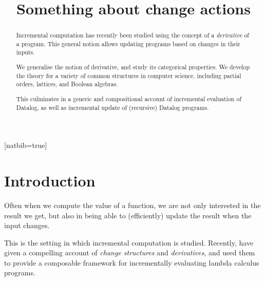 
%


\usepackage{amsmath}
\usepackage{amsthm}
\usepackage{amssymb}
\usepackage{mathtools}
\usepackage{stmaryrd}
\usepackage{biblatex}[natbib=true]
\usepackage{hyperref}
\usepackage{cleveref}



\newif\ifproofs
\proofstrue





%


\begin{abstract}
  Incremental computation has recently been studied using the concept of a
  \textit{derivative} of a program. This general notion allows updating programs
  based on changes in their inputs.

  We generalise the notion of derivative, and study its categorical
  properties. We develop the theory for a variety of common structures
  in computer science, including partial orders, lattices, and Boolean algebras.

  This culminates in a generic and compositional account of incremental evaluation of Datalog, as
  well as incremental update of (recursive) Datalog programs.
\end{abstract}

\title{Something about change actions}

\maketitle

\section{Introduction}

Often when we compute the value of a function, we are not only interested in the
result we get, but also in being able to (efficiently) update the result when
the input changes. 

This is the setting in which incremental computation is studied. Recently,
\textcite{cai2014changes} have given a compelling account
of \textit{change structures} and \textit{derivatives}, and used them to provide
a composable framework for incrementally evaluating lambda calculus programs.

